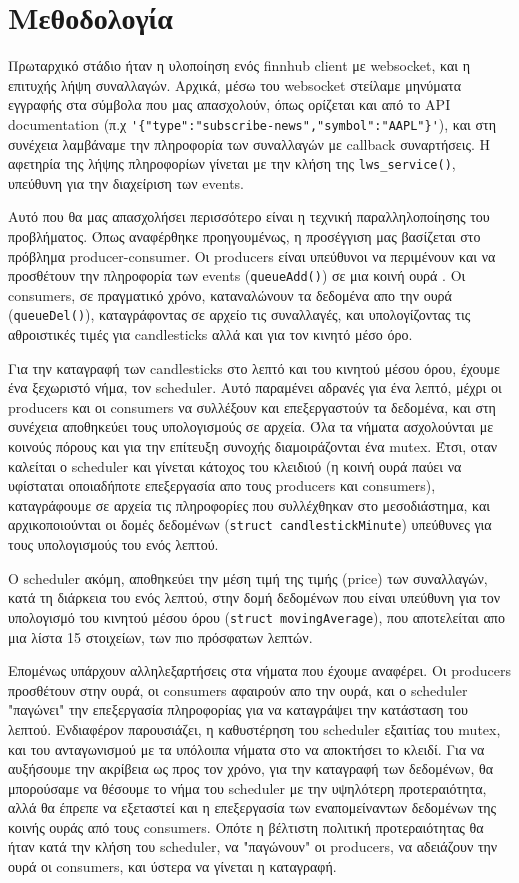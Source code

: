 \documentclass[12pt, a4paper]{article}
\begin{document}
\clearpage

\section{Μεθοδολογία}

Πρωταρχικό στάδιο ήταν η υλοποίηση ενός finnhub client με websocket, και η επιτυχής λήψη συναλλαγών. Αρχικά, μέσω του websocket στείλαμε μηνύματα εγγραφής στα σύμβολα που μας απασχολούν, όπως ορίζεται και από το API documentation (π.χ \verb|'{"type":"subscribe-news","symbol":"AAPL"}'|), και στη συνέχεια λαμβάναμε την πληροφορία των συναλλαγών με callback συναρτήσεις. Η αφετηρία της λήψης πληροφορίων γίνεται με την κλήση της \verb|lws_service()|, υπεύθυνη για την διαχείριση των events.

Αυτό που θα μας απασχολήσει περισσότερο είναι η τεχνική παραλληλοποίησης του προβλήματος. Όπως αναφέρθηκε προηγουμένως, η προσέγγιση μας βασίζεται στο πρόβλημα producer-consumer. Οι producers είναι υπεύθυνοι να περιμένουν και να προσθέτουν την πληροφορία των events (\verb|queueAdd()|) σε μια κοινή ουρά . Οι consumers, σε πραγματικό χρόνο, καταναλώνουν τα δεδομένα απο την ουρά (\verb|queueDel()|), καταγράφοντας σε αρχείο τις συναλλαγές, και υπολογίζοντας τις αθροιστικές τιμές για candlesticks αλλά και για τον κινητό μέσο όρο.

Για την καταγραφή των candlesticks στο λεπτό και του κινητού μέσου όρου, έχουμε ένα ξεχωριστό νήμα, τον scheduler. Αυτό παραμένει αδρανές για ένα λεπτό, μέχρι οι producers και οι consumers να συλλέξουν και επεξεργαστούν τα δεδομένα, και στη συνέχεια αποθηκεύει τους υπολογισμούς σε αρχεία. Όλα τα νήματα ασχολούνται με κοινούς πόρους και για την επίτευξη συνοχής διαμοιράζονται ένα mutex. Έτσι, οταν καλείται ο scheduler και γίνεται κάτοχος του κλειδιού (η κοινή ουρά παύει να υφίσταται οποιαδήποτε επεξεργασία απο τους producers και consumers), καταγράφουμε σε αρχεία τις πληροφορίες που συλλέχθηκαν στο μεσοδιάστημα, και αρχικοποιούνται οι δομές δεδομένων (\verb|struct candlestickMinute|) υπεύθυνες για τους υπολογισμούς του ενός λεπτού.

Ο scheduler ακόμη, αποθηκεύει την μέση τιμή της τιμής (price) των συναλλαγών, κατά τη διάρκεια του ενός λεπτού, στην δομή δεδομένων που είναι υπεύθυνη για τον υπολογισμό του κινητού μέσου όρου (\verb|struct movingAverage|), που αποτελείται απο μια λίστα 15 στοιχείων, των πιο πρόσφατων λεπτών.

Επομένως υπάρχουν αλληλεξαρτήσεις στα νήματα που έχουμε αναφέρει. Οι producers προσθέτουν στην ουρά, οι consumers αφαιρούν απο την ουρά, και ο scheduler "παγώνει" την επεξεργασία πληροφορίας για  να καταγράψει την κατάσταση του λεπτού. Ενδιαφέρον παρουσιάζει, η καθυστέρηση του scheduler εξαιτίας του mutex, και του ανταγωνισμού με τα υπόλοιπα νήματα στο να αποκτήσει το κλειδί. Για να αυξήσουμε την ακρίβεια ως προς τον χρόνο, για την καταγραφή των δεδομένων, θα μπορούσαμε να θέσουμε το νήμα του scheduler με την υψηλότερη προτεραιότητα, αλλά θα έπρεπε να εξεταστεί και η επεξεργασία των εναπομείναντων δεδομένων της κοινής ουράς από τους consumers. Οπότε η βέλτιστη πολιτική προτεραιότητας θα ήταν κατά την κλήση του scheduler, να "παγώνουν" οι producers, να αδειάζουν την ουρά οι consumers, και ύστερα να γίνεται η καταγραφή.
\end{document}
